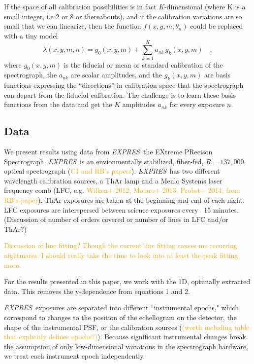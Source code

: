 \documentclass[12pt, letterpaper]{article}
\newcommand{\lz}[1]{\textcolor{orange}{#1}}
\newcommand{\project}[1]{\textsl{#1}}
\newcommand{\acronym}[1]{{\small{#1}}}
\newcommand{\expres}{\project{\acronym{EXPRES}}}
\begin{document}
If the space of all calibration possibilities is in fact $K$-dimensional (where K is a small integer, i.e 2 or 8 or thereabouts), and if the calibration variations are so
small that we can linearize, then the function $f(x,y,m;\theta_{n})$ could
be replaced with a tiny model
\begin{equation}
\lambda(x,y,m,n) = g_0(x,y,m) + \sum_{k=1}^K a_{nk}\,g_k(x,y,m)
\quad ,
\end{equation}
where
$g_0(x,y,m)$ is the fiducial or mean or standard calibration of the
spectrograph,
the $a_{nk}$ are scalar amplitudes,
and the $g_k(x,y,m)$ are basis functions expressing the ``directions'' in calibration space that the spectrograph can depart from the
fiducial calibration.
The challenge is to learn these basis functions from the data and get
the $K$ amplitudes $a_{nk}$ for every exposure $n$.

\subsection{Data} \label{sec:data}
We present results using data from \expres\, the EXtreme PRecison Spectrograph.  \expres\ is an envionmentally stabilized, fiber-fed, $R=137,000$, optical spectrograph (\lz{CJ and RB's papers}).  \expres\ has two different wavelength calibration sources, a ThAr lamp and a Menlo Systems laser frequency comb (LFC, e.g. \lz{Wilken+ 2012, Molaro+ 2013, Probst+ 2014, from RB's paper}).  ThAr exposures are taken at the beginning and end of each night.  LFC exposures are interspersed between science exposures every ~15 minutes.  
(Discussion of number of orders covered or number of lines in LFC and/or ThAr?)

\lz{Discussion of line fitting?  Though the current line fitting causes me recurring nightmares.  I should really take the time to look into at least the peak fitting more.}

For the results presented in this paper, we work with the 1D, optimally extracted data.  This removes the y-dependence from equations 1 and 2.

\expres\ exposures are separated into different ``instrumental epochs," which correspond to changes to the position of the echellogram on the detector, the shape of the instrumental PSF, or the calibration sources (\lz{(worth including table that explicitly defines epochs?)}).  Because significant instrumental changes break the assumption of only low-dimensional variations in the spectrograph hardware, we treat each instrument epoch independently.
\end{document}
